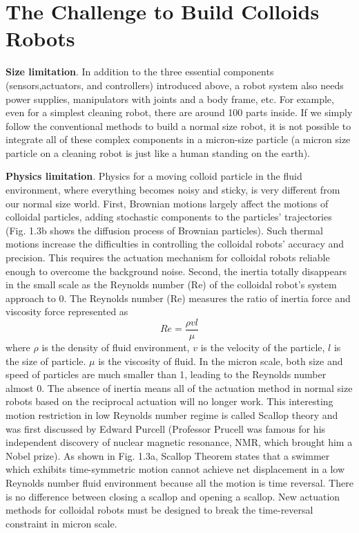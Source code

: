\section{The Challenge to  Build Colloids Robots}

\textbf{Size limitation}. In addition to the three essential components (sensors,actuators, and controllers) introduced above, a robot system also needs power supplies, manipulators with joints and a body frame, etc. For example,  even for a simplest cleaning robot, there are around 100 parts inside. If we simply follow the conventional methods to build a normal size robot, it is not possible to integrate all of these complex components in a micron-size particle (a micron size particle on a cleaning robot is just like a human standing on the earth).  

\textbf{Physics limitation}. Physics for a moving colloid particle in the fluid environment, where everything becomes noisy and sticky, is very different from our normal size world. First, Brownian motions largely affect the motions of colloidal particles, adding stochastic components to the particles' trajectories (Fig. 1.3b shows the diffusion process of Brownian particles). Such thermal motions increase the difficulties in controlling the colloidal robots' accuracy and precision. This requires the actuation mechanism for colloidal robots reliable enough to overcome the background noise. Second, the inertia totally disappears in the small scale as the Reynolds number (Re) of the colloidal robot's system approach to 0.  The Reynolds number (Re) measures the ratio of inertia force and viscosity force represented as
\begin{equation}
    Re=\frac{\rho v l}{\mu}
\end{equation}
where $\rho $ is the density of fluid environment, $v$ is the velocity of the particle, $l$ is the size of particle. $\mu$ is the  viscosity of fluid. In the micron scale, both size and speed of particles are much smaller than 1, leading to the Reynolds number almost 0. The absence of inertia means all of the actuation method in normal size robots based on the reciprocal actuation will no longer work. This interesting  motion restriction in low Reynolds number regime is called Scallop
theory and was first discussed by Edward Purcell\autocite{purcell1977life} (Professor Prucell was famous for his independent discovery of nuclear magnetic resonance, NMR, which brought him a Nobel prize). As shown in Fig. 1.3a, Scallop Theorem states that a swimmer which exhibits time-symmetric motion cannot achieve net displacement in a low Reynolds number fluid environment because all the motion is time reversal. There is no difference between closing a scallop and opening a scallop. New actuation methods for colloidal robots must be designed to break the time-reversal constraint in micron scale. 


